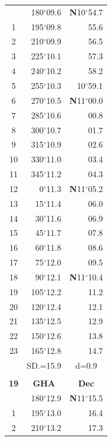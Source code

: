 \documentclass[10pt, a4paper]{report}
\begin{document}
\begin{scriptsize}
\begin{tabular*}{0.2\textwidth}[t]{@{\extracolsep{\fill}}|c|rr|}
\hline\rule{0pt}{2.6ex}\noindent
0 & 180$^\circ$09.6 & \textbf{N}10$^\circ$54.7\\
1 & 195$^\circ$09.8 & 55.6\\
2 & 210$^\circ$09.9 & 56.5\\
3 & 225$^\circ$10.1 & \raisebox{0.24ex}{\boldmath$\cdot$~\boldmath$\cdot$~~}57.3\\
4 & 240$^\circ$10.2 & 58.2\\
5 & 255$^\circ$10.3 & 10$^\circ$59.1\\[2Pt]
6 & 270$^\circ$10.5 & \textbf{N}11$^\circ$00.0\\
7 & 285$^\circ$10.6 & 00.8\\
8 & 300$^\circ$10.7 & 01.7\\
9 & 315$^\circ$10.9 & \raisebox{0.24ex}{\boldmath$\cdot$~\boldmath$\cdot$~~}02.6\\
10 & 330$^\circ$11.0 & 03.4\\
11 & 345$^\circ$11.2 & 04.3\\[2Pt]
12 & 0$^\circ$11.3 & \textbf{N}11$^\circ$05.2\\
13 & 15$^\circ$11.4 & 06.0\\
14 & 30$^\circ$11.6 & 06.9\\
15 & 45$^\circ$11.7 & \raisebox{0.24ex}{\boldmath$\cdot$~\boldmath$\cdot$~~}07.8\\
16 & 60$^\circ$11.8 & 08.6\\
17 & 75$^\circ$12.0 & 09.5\\[2Pt]
18 & 90$^\circ$12.1 & \textbf{N}11$^\circ$10.4\\
19 & 105$^\circ$12.2 & 11.2\\
20 & 120$^\circ$12.4 & 12.1\\
21 & 135$^\circ$12.5 & \raisebox{0.24ex}{\boldmath$\cdot$~\boldmath$\cdot$~~}12.9\\
22 & 150$^\circ$12.6 & 13.8\\
23 & 165$^\circ$12.8 & 14.7\\
\hline
\rule{0pt}{2.4ex} & \multicolumn{1}{c}{SD.=15.9} & \multicolumn{1}{c|}{d=0.9}\\
\hline
\multicolumn{1}{c}{}\\[-0.5ex]\hline
\multicolumn{1}{|c|}{\rule{0pt}{2.6ex}\textbf{19}} & \multicolumn{1}{c}{\textbf{GHA}} & \multicolumn{1}{c|}{\textbf{Dec}}\\
\hline\rule{0pt}{2.6ex}\noindent
0 & 180$^\circ$12.9 & \textbf{N}11$^\circ$15.5\\
1 & 195$^\circ$13.0 & 16.4\\
2 & 210$^\circ$13.2 & 17.3\\

\end{tabular*}
\end{scriptsize}
\end{document}
